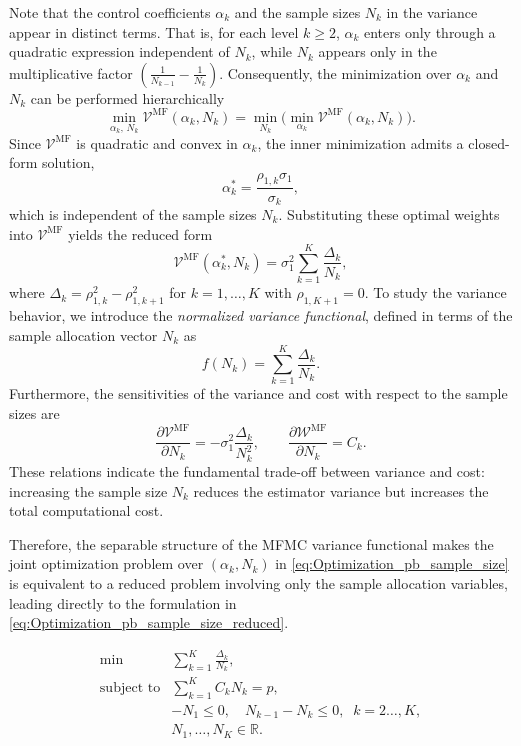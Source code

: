 Note that the control coefficients $\alpha_k$ and the sample sizes $N_k$ in the variance appear in distinct terms. 
That is, for each level $k\ge 2$, $\alpha_k$ enters only through a quadratic expression independent of $N_k$, 
while $N_k$ appears only in the multiplicative factor 
$\left(\frac{1}{N_{k-1}} - \frac{1}{N_k}\right)$. 
Consequently, the minimization over $\alpha_k$ and $N_k$ can be performed hierarchically
\begin{equation*}
    \min_{\alpha_k,\, N_k} \mathcal{V}^{\text{MF}}\left(\alpha_k, N_k\right)
    = \min_{N_k}\Big(\min_{\alpha_k} \mathcal{V}^{\text{MF}}(\alpha_k, N_k)\Big).
\end{equation*}
Since $\mathcal{V}^{\text{MF}}$ is quadratic and convex in $\alpha_k$, the inner minimization admits a closed-form solution,
\begin{equation}\label{eq:MFMC_weights}
    \alpha_k^* = \frac{\rho_{1,k}\sigma_1}{\sigma_k},
\end{equation}
which is independent of the sample sizes $N_k$. 
Substituting these optimal weights into $\mathcal{V}^{\text{MF}}$ yields the reduced form
\begin{equation*}
    \mathcal{V}^{\text{MF}}\left(\alpha_k^*, N_k\right)
    = \sigma_1^2\sum_{k=1}^K \frac{\Delta_k}{N_k},
\end{equation*}
where $\Delta_k = \rho_{1,k}^2 - \rho_{1,k+1}^2$ for $k = 1, \dots, K$ with $\rho_{1,K+1}=0$. To study the variance behavior, we introduce the {\it normalized variance functional}, defined in terms of the sample allocation vector $N_k$ as
\[
f(N_k) =\sum_{k=1}^K \frac{\Delta_k}{N_k}.
\]
Furthermore, the sensitivities of the variance and cost with respect to the sample sizes are
\[
\frac{\partial \mathcal{V}^{\text{MF}}}{\partial N_k} = -\sigma_1^2\frac{\Delta_k}{N_k^2},
\qquad 
\frac{\partial \mathcal{W}^{\text{MF}}}{\partial N_k} = C_k.
\]
These relations indicate the fundamental trade-off between variance and cost: increasing the sample size $N_k$ reduces the estimator variance but increases the total computational cost.


Therefore, the separable structure of the MFMC variance functional makes the joint optimization problem over $(\alpha_k, N_k)$ in \eqref{eq:Optimization_pb_sample_size} is equivalent to a reduced problem involving only the sample allocation variables,
leading directly to the formulation in \eqref{eq:Optimization_pb_sample_size_reduced}.


%
\begin{equation}\label{eq:Optimization_pb_sample_size_reduced}
    \begin{array}{ll}
    \min &\sum_{k=1}^K \frac{\Delta_k}{N_k},\\
       \text{subject to} &\displaystyle\sum\limits_{k=1}^K C_kN_k=p,\\[2pt]
       &\displaystyle -N_1\le 0,\quad \displaystyle N_{k-1}-N_k\le 0, \;\; k=2\ldots,K,\\
       &N_1,\ldots, N_K\in \mathbb{R}.
    \end{array}
\end{equation}
%



